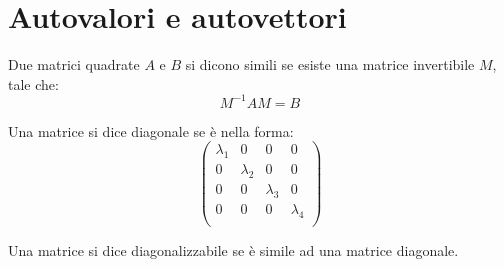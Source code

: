 \section{Autovalori e autovettori}

\begin{definition}
  Due matrici quadrate $A$ e $B$ si dicono simili se esiste una matrice invertibile $M$, tale che:
  $$M^{-1}AM=B$$
\end{definition}

\begin{definition}
  Una matrice si dice diagonale se è nella forma:
  $$
    \begin{pmatrix}
      \lambda_1 & 0         & 0         & 0         \\
      0         & \lambda_2 & 0         & 0         \\
      0         & 0         & \lambda_3 & 0         \\
      0         & 0         & 0         & \lambda_4 \\
    \end{pmatrix}
  $$
\end{definition}

\begin{definition}
  Una matrice si dice diagonalizzabile se è simile ad una matrice diagonale.
\end{definition}

